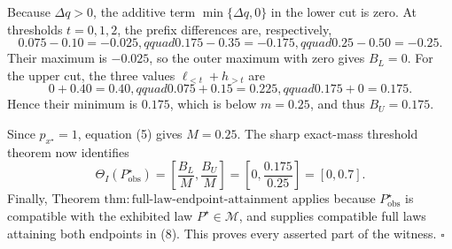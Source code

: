 Because \(\Delta q>0\), the additive term
\(\min\{\Delta q,0\}\) in the lower cut is zero.  At thresholds
\(t=0,1,2\), the prefix differences are, respectively,
\[
0.075-0.10=-0.025,qquad
0.175-0.35=-0.175,qquad
0.25-0.50=-0.25.
\tag{6}
\]
Their maximum is \(-0.025\), so the outer maximum with zero gives
\(B_L=0\).  For the upper cut, the three values
\(\ell_{<t}+h_{>t}\) are
\[
0+0.40=0.40,qquad
0.075+0.15=0.225,qquad
0.175+0=0.175.
\tag{7}
\]
Hence their minimum is \(0.175\), which is below \(m=0.25\), and thus
\(B_U=0.175\).

Since \(p_{x^{\star}}=1\), equation (5) gives \(M=0.25\).  The sharp
exact-mass threshold theorem now identifies
\[
\Theta_I(P_{\mathrm{obs}}^{\star})
=\left[\frac{B_L}{M},\frac{B_U}{M}\right]
=\left[0,\frac{0.175}{0.25}\right]=[0,0.7].
\tag{8}
\]
Finally, Theorem
\(\mathrm{thm{:}full\text{-}law\text{-}endpoint\text{-}attainment}\)
applies because \(P_{\mathrm{obs}}^{\star}\) is compatible with the
exhibited law \(P^{\star}\in\mathcal M\), and supplies compatible full
laws attaining both endpoints in (8).  This proves every asserted part of
the witness. \(\square\)